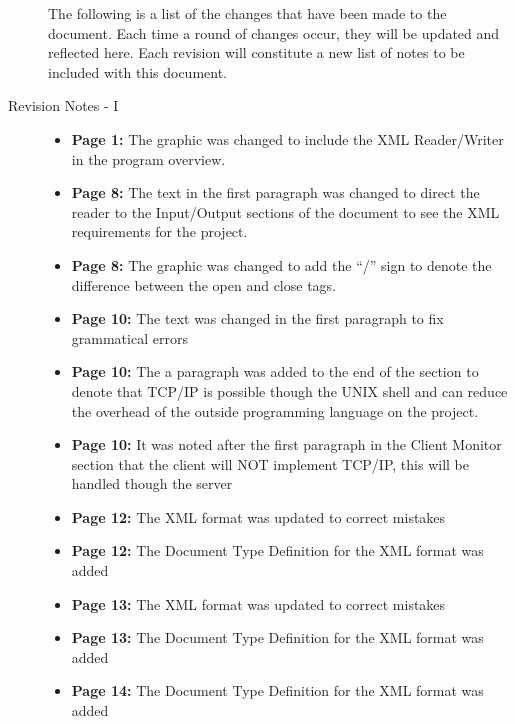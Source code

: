 \documentclass[11pt, letterpaper]{report}
\begin{document}
\begin{description}
\begin{itemize}
\end{itemize}
\newpage
The following is a list of the changes that have been made to the document. Each time a round of changes occur, they will be updated and reflected here. Each revision will constitute a new list of notes to be included with this document.
\item[\Large Revision Notes - I]\hfill
\begin{itemize}
\item \textbf{Page 1:} The graphic was changed to include the XML Reader/Writer in the program overview. 
\item \textbf{Page 8:} The text in the first paragraph was changed to direct the reader to the Input/Output sections of the document to see the XML requirements for the project. 
\item \textbf{Page 8:} The graphic was changed to add the ``/'' sign to denote the difference between the open and close tags.
\item\textbf{Page 10:} The text was changed in the first paragraph to fix grammatical errors
\item \textbf{Page 10:} The a paragraph was added to the end of the section to denote that TCP/IP is possible though the UNIX shell and can reduce the overhead of the outside programming language on the project.
\item \textbf{Page 10:} It was noted after the first paragraph in the Client Monitor section that the client will NOT implement TCP/IP, this will be handled though the server
\item \textbf{Page 12:} The XML format was updated to correct mistakes
\item \textbf{Page 12:} The Document Type Definition for the XML format was added
\item \textbf{Page 13:} The XML format was updated to correct mistakes
\item \textbf{Page 13:} The Document Type Definition for the XML format was added
\item \textbf{Page 14:} The Document Type Definition for the XML format was added
\end{itemize}


\end{description}
\end{document}
